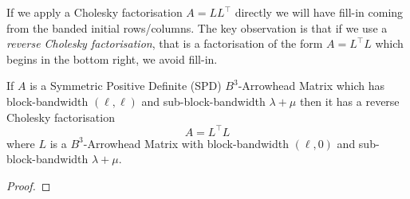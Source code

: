 \documentclass[hidelinks,onefignum,onetabnum]{siamart220329}
\begin{document}
If we apply a Cholesky factorisation $A = L L^\top$ directly we will have fill-in coming from the banded initial rows/columns. The key observation is that if we use a {\it reverse Cholesky factorisation}, that is  a factorisation of the form $A = L^\top L$ which begins in the bottom right, we avoid fill-in. 


\begin{theorem}
If $A$ is a Symmetric Positive Definite (SPD) $B^3$-Arrowhead Matrix which has block-bandwidth $(\ell,\ell)$ and sub-block-bandwidth $\lambda+\mu$ then it has a reverse Cholesky factorisation
\[
	A = L^\top L
\]
where $L$ is a $B^3$-Arrowhead Matrix with block-bandwidth $(\ell,0)$ and sub-block-bandwidth $\lambda+\mu$.
\end{theorem}
\begin{proof}





\end{proof}
\end{document}

